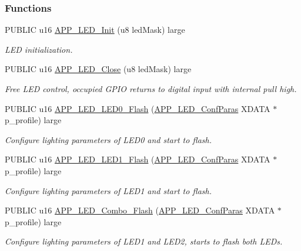 \subsubsection*{Functions}
\begin{DoxyCompactItemize}
\item 
P\+U\+B\+L\+IC u16 \hyperlink{group___l_e_d_ga8250ab2f67c15b9a735477ae0c7948ee}{A\+P\+P\+\_\+\+L\+E\+D\+\_\+\+Init} (u8 led\+Mask) large
\begin{DoxyCompactList}\small\item\em L\+ED initialization. \end{DoxyCompactList}\item 
P\+U\+B\+L\+IC u16 \hyperlink{group___l_e_d_ga42256e088d86fda8dd2d10a7a95f2ecc}{A\+P\+P\+\_\+\+L\+E\+D\+\_\+\+Close} (u8 led\+Mask) large
\begin{DoxyCompactList}\small\item\em Free L\+ED control, occupied G\+P\+IO returns to digital input with internal pull high. \end{DoxyCompactList}\item 
P\+U\+B\+L\+IC u16 \hyperlink{group___l_e_d_ga9c74c2c5418e40b14383cebc82667ab1}{A\+P\+P\+\_\+\+L\+E\+D\+\_\+\+L\+E\+D0\+\_\+\+Flash} (\hyperlink{struct_a_p_p___l_e_d___conf_paras}{A\+P\+P\+\_\+\+L\+E\+D\+\_\+\+Conf\+Paras} X\+D\+A\+TA $\ast$p\+\_\+profile) large
\begin{DoxyCompactList}\small\item\em Configure lighting parameters of L\+E\+D0 and start to flash. \end{DoxyCompactList}\item 
P\+U\+B\+L\+IC u16 \hyperlink{group___l_e_d_gaea916b986322d9ba25f6a6e9c94f8835}{A\+P\+P\+\_\+\+L\+E\+D\+\_\+\+L\+E\+D1\+\_\+\+Flash} (\hyperlink{struct_a_p_p___l_e_d___conf_paras}{A\+P\+P\+\_\+\+L\+E\+D\+\_\+\+Conf\+Paras} X\+D\+A\+TA $\ast$p\+\_\+profile) large
\begin{DoxyCompactList}\small\item\em Configure lighting parameters of L\+E\+D1 and start to flash. \end{DoxyCompactList}\item 
P\+U\+B\+L\+IC u16 \hyperlink{group___l_e_d_ga6885c17555b9715547963fc930dff934}{A\+P\+P\+\_\+\+L\+E\+D\+\_\+\+Combo\+\_\+\+Flash} (\hyperlink{struct_a_p_p___l_e_d___conf_paras}{A\+P\+P\+\_\+\+L\+E\+D\+\_\+\+Conf\+Paras} X\+D\+A\+TA $\ast$p\+\_\+profile) large
\begin{DoxyCompactList}\small\item\em Configure lighting parameters of L\+E\+D1 and L\+E\+D2, starts to flash both L\+E\+Ds. \end{DoxyCompactList}\end{DoxyCompactItemize}


